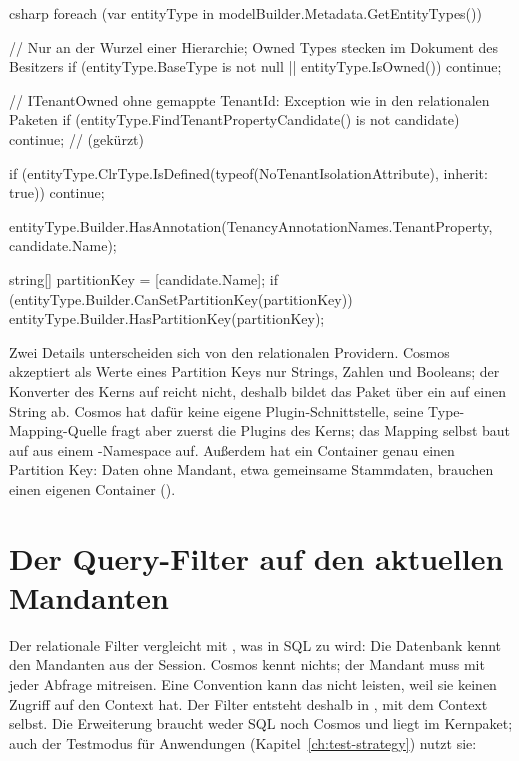\begin{sourcecode}{csharp}
foreach (var entityType in modelBuilder.Metadata.GetEntityTypes())
{
    // Nur an der Wurzel einer Hierarchie; Owned Types stecken im Dokument des Besitzers
    if (entityType.BaseType is not null || entityType.IsOwned())
        continue;

    // ITenantOwned ohne gemappte TenantId: Exception wie in den relationalen Paketen
    if (entityType.FindTenantPropertyCandidate() is not { } candidate)
        continue;      // (gekürzt)

    if (entityType.ClrType.IsDefined(typeof(NoTenantIsolationAttribute), inherit: true))
        continue;

    entityType.Builder.HasAnnotation(TenancyAnnotationNames.TenantProperty, candidate.Name);

    string[] partitionKey = [candidate.Name];
    if (entityType.Builder.CanSetPartitionKey(partitionKey))
        entityType.Builder.HasPartitionKey(partitionKey);
}
\end{sourcecode}

Zwei Details unterscheiden sich von den relationalen Providern. Cosmos akzeptiert als Werte
eines Partition Keys nur Strings, Zahlen und Booleans; der Konverter des Kerns auf
 reicht nicht, deshalb bildet das Paket  über ein
 auf einen String ab.
Cosmos hat dafür keine eigene Plugin-Schnittstelle, seine Type-Mapping-Quelle fragt aber zuerst
die Plugins des Kerns; das Mapping selbst baut auf
 aus einem -Namespace auf.
Außerdem hat ein Container genau einen Partition Key: Daten ohne Mandant, etwa gemeinsame
Stammdaten, brauchen einen eigenen Container ().

\section{Der Query-Filter auf den aktuellen Mandanten}

Der relationale Filter vergleicht mit
, was in
SQL zu  wird: Die Datenbank kennt den Mandanten
aus der Session. Cosmos kennt nichts; der Mandant muss mit jeder Abfrage mitreisen. Eine
Convention kann das nicht leisten, weil sie keinen Zugriff auf den Context hat. Der Filter
entsteht deshalb in , mit dem Context selbst.
Die Erweiterung braucht weder SQL noch Cosmos und liegt im Kernpaket; auch der Testmodus für
Anwendungen (Kapitel~\ref{ch:test-strategy}) nutzt sie:

